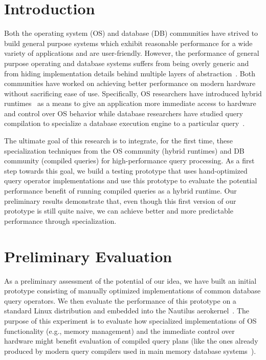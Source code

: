 \documentclass[conference]{IEEEtran}
\begin{document}
\section{Introduction}

  Both the operating system (OS) and database (DB) communities have strived to build general purpose systems which exhibit reasonable performance for a wide variety of applications and are user-friendly.
  However, the performance of general purpose operating and database systems suffers from being overly generic and from hiding implementation details behind multiple layers of abstraction~\cite{GICEVA:2016:OS_SUPPORT}.
Both communities have worked on achieving better performance on modern hardware without sacrificing ease of use. Specifically, OS researchers have introduced hybrid runtimes~\cite{HALE:2017:MULTIVERSE,HALE:2016:MULTIVERSE,HALE:2015:NAUTILUS,HALE:2016:HRTHVM} as a means to give an application more immediate access to hardware and control over OS behavior while database researchers have studied query compilation to specialize a database execution engine to a particular query~\cite{SK16,N11}.

The ultimate goal of this research is to integrate, for the first time, these specialization techniques from the OS community (hybrid runtimes) and DB community (compiled queries) for high-performance query processing.
As a first step towards this goal, we build a testing prototype that uses hand-optimized query operator implementations and use this prototype to evaluate the potential performance benefit of running compiled queries as a hybrid runtime.
%
Our preliminary results demonstrate that, even though this first version of our prototype is still quite naive, we can achieve better and more predictable performance through specialization.
%





\section{Preliminary Evaluation}

As a preliminary assessment of the potential of our idea, we have built an initial prototype consisting of manually optimized implementations of common database query operators. We then evaluate the performance of this prototype on a standard Linux distribution and embedded into the Nautilus aerokernel~\cite{HALE:2015:NAUTILUS}. The purpose of this experiment is to evaluate how specialized implementations of OS functionality (e.g., memory management) and the immediate control over hardware might benefit evaluation of compiled query plans (like the ones already produced by modern query compilers used in main memory database systems~\cite{N11}).
\end{document}
